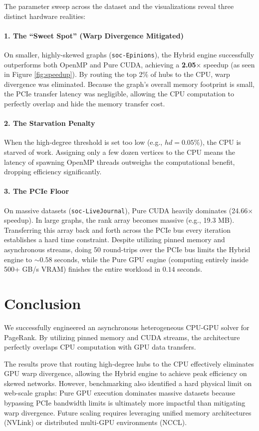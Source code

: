 \documentclass[12pt,a4paper]{article}
\begin{document}
   The parameter sweep across the dataset and the visualizations reveal three distinct hardware realities:

   \paragraph{1. The ``Sweet Spot'' (Warp Divergence Mitigated)}
   On smaller, highly-skewed graphs (\texttt{soc-Epinions}), the Hybrid engine successfully outperforms both OpenMP and Pure CUDA, achieving a \textbf{2.05$\times$} speedup (as seen in Figure \ref{fig:speedup}). By routing the top 2\% of hubs to the CPU, warp divergence was eliminated. Because the graph's overall memory footprint is small, the PCIe transfer latency was negligible, allowing the CPU computation to perfectly overlap and hide the memory transfer cost.

   \paragraph{2. The Starvation Penalty}
   When the high-degree threshold is set too low (e.g., $hd=0.05\%$), the CPU is starved of work. Assigning only a few dozen vertices to the CPU means the latency of spawning OpenMP threads outweighs the computational benefit, dropping efficiency significantly.

   \paragraph{3. The PCIe Floor}
   On massive datasets (\texttt{soc-LiveJournal}), Pure CUDA heavily dominates (24.66$\times$ speedup). In large graphs, the rank array becomes massive (e.g., 19.3 MB). Transferring this array back and forth across the PCIe bus every iteration establishes a hard time constraint. Despite utilizing pinned memory and asynchronous streams, doing 50 round-trips over the PCIe bus limits the Hybrid engine to $\sim0.58$ seconds, while the Pure GPU engine (computing entirely inside 500+ GB/s VRAM) finishes the entire workload in $0.14$ seconds.

   \section{Conclusion}
   We successfully engineered an asynchronous heterogeneous CPU-GPU solver for PageRank. By utilizing pinned memory and CUDA streams, the architecture perfectly overlaps CPU computation with GPU data transfers. 
    
   The results prove that routing high-degree hubs to the CPU effectively eliminates GPU warp divergence, allowing the Hybrid engine to achieve peak efficiency on skewed networks. However, benchmarking also identified a hard physical limit on web-scale graphs: Pure GPU execution dominates massive datasets because bypassing PCIe bandwidth limits is ultimately more impactful than mitigating warp divergence. Future scaling requires leveraging unified memory architectures (NVLink) or distributed multi-GPU environments (NCCL).

	\newpage
  
\end{document}
